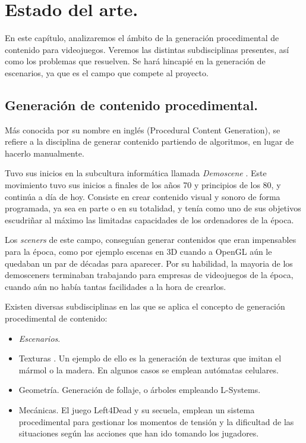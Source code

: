 \chapter{Estado del arte.}\label{cap:capitulo1}

En este capítulo, analizaremos el ámbito de la generación procedimental de contenido para videojuegos. Veremos las distintas subdisciplinas presentes, así como los problemas que resuelven. Se hará hincapié en la generación de escenarios, ya que es el campo que compete al proyecto.

\section{Generación de contenido procedimental.}

Más conocida por su nombre en inglés (Procedural Content Generation), se refiere a la disciplina de generar contenido partiendo de algoritmos, en lugar de hacerlo manualmente.

Tuvo sus inicios en la subcultura informática llamada \emph{Demoscene} \cite{dmscn}. Este movimiento tuvo sus inicios a finales de los años 70 y principios de los 80, y continúa a día de hoy. Consiste en crear contenido visual y sonoro de forma programada, ya sea en parte o en su totalidad, y tenía como uno de sus objetivos escudriñar al máximo las limitadas capacidades de los ordenadores de la época.

Los \emph{sceners} de este campo, conseguían generar contenidos que eran impensables para la época, como por ejemplo escenas en 3D cuando a OpenGL aún le quedaban un par de décadas para aparecer. Por su habilidad, la mayoria de los demosceners terminaban trabajando para empresas de videojuegos de la época, cuando aún no había tantas facilidades a la hora de crearlos.

Existen diversas subdisciplinas en las que se aplica el concepto de generación procedimental de contenido:

\begin{itemize}
	\item \emph{Escenarios}.
	\item Texturas \cite{texmodproc}. Un ejemplo de ello es la generación de texturas que imitan el mármol o la madera. En algunos casos se emplean autómatas celulares.
	\item Geometría. Generación de follaje, o árboles empleando L-Systems. \cite{texmodproc}
	\item Mecánicas. El juego Left4Dead y su secuela, emplean un sistema procedimental para gestionar los momentos de tensión y la dificultad de las situaciones según las acciones que han ido tomando los jugadores.
\end{itemize}

